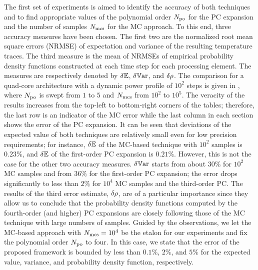 
The first set of experiments is aimed to identify the accuracy of both techniques and to find appropriate values of the polynomial order ${N_\text{po}}$ for the PC expansion and the number of samples $N_\text{mcs}$ for the MC approach. To this end, three accuracy measures have been chosen. The first two are the normalized root mean square errors (NRMSE) of expectation and variance of the resulting temperature traces. The third measure is the mean of NRMSEs of empirical probability density functions constructed at each time step for each processing element. The measures are respectively denoted by $\delta\mathbb{E}$, $\delta\mathbb{V}\text{ar}$, and $\delta\rho$. The comparison for a quad-core architecture with a dynamic power profile of $10^2$ steps is given in , where ${N_\text{po}}$ is swept from $1$ to $5$ and $N_\text{mcs}$ from $10^2$ to $10^5$. The veracity of the results increases from the top-left to bottom-right corners of the tables; therefore, the last row is an indicator of the MC error while the last column in each section shows the error of the PC expansion. It can be seen that deviations of the expected value of both techniques are relatively small even for low precision requirements; for instance, $\delta\mathbb{E}$ of the MC-based technique with $10^2$ samples is $0.23\%$, and $\delta\mathbb{E}$ of the first-order PC expansion is $0.21\%$. However, this is not the case for the other two accuracy measures. $\delta\mathbb{V}\text{ar}$ starts from about $30\%$ for $10^2$ MC samples and from $36\%$ for the first-order PC expansion; the error drops significantly to less than $2\%$ for $10^4$ MC samples and the third-order PC. The results of the third error estimate, $\delta\rho$, are of a particular importance since they allow us to conclude that the probability density functions computed by the fourth-order (and higher) PC expansions are closely following those of the MC technique with large numbers of samples. Guided by the observations, we let the MC-based approach with $N_\text{mcs} = 10^4$ be the etalon for our experiments and fix the polynomial order ${N_\text{po}}$ to four. In this case, we state that the error of the proposed framework is bounded by less than $0.1\%$, $2\%$, and $5\%$ for the expected value, variance, and probability density function, respectively.

